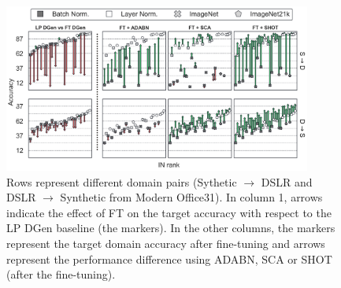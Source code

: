 \documentclass{article}
\begin{document}
\begin{figure}[h!]
\begin{center}
\includegraphics[width=0.9\textwidth]{images/bars_failure_example.png}
\end{center}
\caption{Rows represent different domain pairs (Sythetic $\to$ DSLR and DSLR $\to$ Synthetic from Modern Office31). 
In column 1, arrows indicate the effect of FT on the target accuracy with respect to the LP DGen baseline (the markers). In the other columns, the markers represent the target domain accuracy after fine-tuning and arrows represent the performance difference using ADABN, SCA or SHOT (after the fine-tuning).
}
\label{failures}
\end{figure}

 
\end{document}

